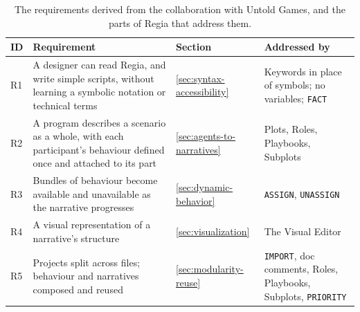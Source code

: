 \begin{table}[htpb]
\centering
\small
\begin{tabular}{|l|p{6.2cm}|l|p{4.3cm}|}
\hline
\textbf{ID} & \textbf{Requirement} & \textbf{Section} & \textbf{Addressed by} \\
\hline
R1 & A designer can read Regia, and write simple scripts, without learning a symbolic notation or technical terms & \ref{sec:syntax-accessibility} & Keywords in place of symbols; no variables; \lstinline|FACT| \\
\hline
R2 & A program describes a scenario as a whole, with each participant's behaviour defined once and attached to its part & \ref{sec:agents-to-narratives} & Plots, Roles, Playbooks, Subplots \\
\hline
R3 & Bundles of behaviour become available and unavailable as the narrative progresses & \ref{sec:dynamic-behavior} & \lstinline|ASSIGN|, \lstinline|UNASSIGN| \\
\hline
R4 & A visual representation of a narrative's structure & \ref{sec:visualization} & The Visual Editor \\
\hline
R5 & Projects split across files; behaviour and narratives composed and reused & \ref{sec:modularity-reuse} & \lstinline|IMPORT|, doc comments, Roles, Playbooks, Subplots, \lstinline|PRIORITY| \\
\hline
\end{tabular}
\caption{The requirements derived from the collaboration with Untold Games, and the parts of Regia that address them.}
\label{tab:requirements}
\end{table}
